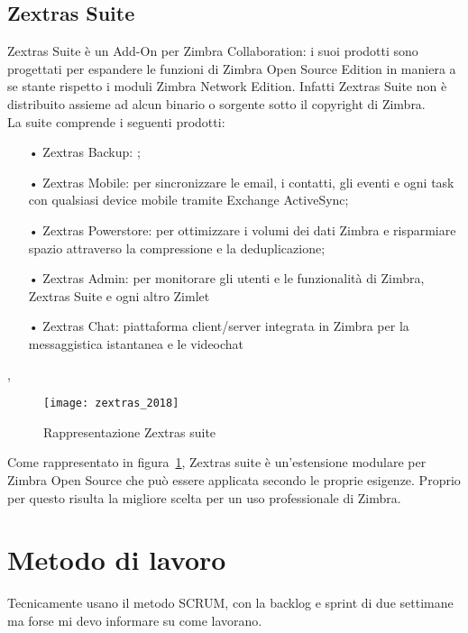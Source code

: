 \subsection{Zextras Suite}
Zextras Suite è un Add-On per Zimbra Collaboration: i suoi prodotti sono progettati per espandere le funzioni di Zimbra Open Source Edition in maniera a se stante rispetto i moduli Zimbra Network Edition. Infatti Zextras Suite non è distribuito assieme ad alcun binario o sorgente sotto il copyright di Zimbra. \\
La suite comprende i seguenti prodotti:
	\begin{itemize}
		\item[•] Zextras Backup: ;
		\item[•] Zextras Mobile: per sincronizzare le email, i contatti, gli eventi e ogni task con qualsiasi device mobile tramite Exchange ActiveSync;
		\item[•] Zextras Powerstore: per ottimizzare i volumi dei dati Zimbra e risparmiare spazio attraverso la compressione e la deduplicazione;
		\item[•] Zextras Admin: per monitorare gli utenti e le funzionalità di Zimbra, Zextras Suite e ogni altro Zimlet
		\item[•] Zextras Chat: piattaforma client/server integrata in Zimbra per la messaggistica istantanea e le videochat
	\end{itemize},

\begin{figure}[H] 
	\centering
	\texttt{[image: zextras\_2018]}
	\caption{Rappresentazione Zextras suite}
	\label{fig:modulizextras}
\end{figure}
Come rappresentato in figura~\ref{fig:modulizextras}, Zextras suite è un'estensione modulare per Zimbra Open Source che può essere applicata secondo le proprie esigenze. Proprio per questo risulta la migliore scelta per un uso professionale di Zimbra.

\section{Metodo di lavoro}
Tecnicamente usano il metodo SCRUM, con la backlog e sprint di due settimane ma forse mi devo informare su come lavorano. \\


